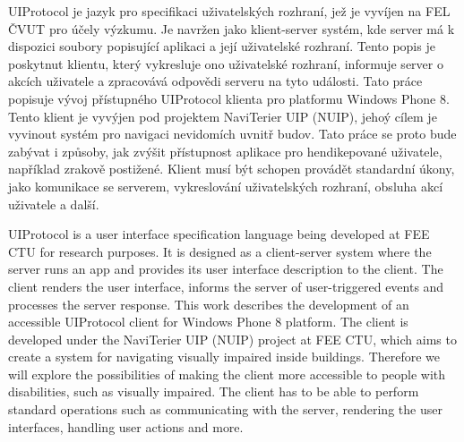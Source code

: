 \startAbstractCz
UIProtocol je jazyk pro specifikaci uživatelských rozhraní, jež je vyvíjen na FEL ČVUT pro účely výzkumu. Je navržen jako klient-server systém, kde server má k dispozici soubory popisující aplikaci a její uživatelské rozhraní. Tento popis je poskytnut klientu, který vykresluje ono uživatelské rozhraní, informuje server o akcích uživatele a zpracovává odpovědi serveru na tyto události. Tato práce popisuje vývoj přístupného UIProtocol klienta pro platformu Windows Phone 8. Tento klient je vyvýjen pod projektem NaviTerier UIP (NUIP), jehoý cílem je vyvinout systém pro navigaci nevidomích uvnitř budov. Tato práce se proto bude zabývat i způsoby, jak zvýšit přístupnost aplikace pro hendikepované uživatele, například zrakově postižené. Klient musí být schopen provádět standardní úkony, jako komunikace se serverem, vykreslování uživatelských rozhraní, obsluha akcí uživatele a další.
\stopAbstractCz

\startAbstractEn
UIProtocol is a user interface specification language being developed at FEE CTU for research purposes. It is designed as a client-server system where the server runs an app and provides its user interface description to the client. The client renders the user interface, informs the server of user-triggered events and processes the server response. This work describes the development of an accessible UIProtocol client for Windows Phone 8 platform. The client is developed under the NaviTerier UIP (NUIP) project at FEE CTU, which aims to create a system for navigating visually impaired inside buildings. Therefore we will explore the possibilities of making the client more accessible to people with disabilities, such as visually impaired. The client has to be able to perform standard operations such as communicating with the server, rendering the user interfaces, handling user actions and more.
\stopAbstractEn

\endinput
